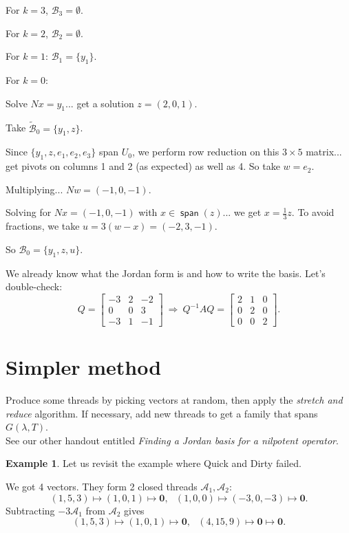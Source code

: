 \documentclass[11pt]{article}
\newcommand{\1}{\mathbf{1}}
\newcommand{\0}{\mathbf{0}}
\newcommand{\A}{\mathcal{A}}
\newcommand{\B}{\mathcal{B}}
\DeclareMathOperator{\myspan}{\mathsf{span}}
\theoremstyle{definition}
\newtheorem{example}{Example}
\begin{document}
For $k=3$, $\B_3 = \emptyset$.

For $k=2$, $\B_2 = \emptyset$.

For $k=1$: $\B_1 = \{y_1\}$.

For $k=0$:

Solve $Nx = y_1$... get a solution $z = (2,0,1)$.

Take $\tilde{\B}_0 = \{y_1,z\}$.

Since $\{y_1,z,e_1,e_2,e_3\}$ span $U_0$, we perform row reduction on this $3 \times 5$ matrix... get pivots on columns 1 and 2 (as expected) as well as 4.
So take $w=e_2$.

Multiplying... $Nw = (-1,0,-1)$.

Solving for $Nx = (-1,0,-1)$ with $x \in \myspan(z)$... we get $x = \frac{1}{3}z$.
To avoid fractions, we take $u = 3 (w-x) = (-2,3,-1)$.

So $\B_0 = \{y_1,z,u\}$.

We already know what the Jordan form is and how to write the basis.
Let's double-check:
\[
Q=
\begin{bmatrix}
-3 & 2 & -2 \\
0 & 0 & 3 \\
-3 & 1 & -1
\end{bmatrix}
\
\Longrightarrow
\
Q^{-1}AQ = 
\left[
\begin{array}{rr|r}
2 & 1 & 0 \\
0 & 2 & 0 \\
\hline
0 & 0 & 2
\end{array}
\right]
.
\]

\clearpage

\section*{Simpler method}

Produce some threads by picking vectors at random, then apply the \emph{stretch and reduce} algorithm.
If necessary, add new threads to get a family that spans $G(\lambda,T)$.
\\

\hfil
See our other handout entitled \emph{Finding a Jordan basis for a nilpotent operator}.
\\

\begin{example}
Let us revisit the example where Quick and Dirty failed.
\end{example}

We got 4 vectors.
They form 2 closed threads $\A_1,\A_2$:
\[
(1,5,3) \mapsto (1,0,1) \mapsto \0
, \ \ \
(1,0,0) \mapsto (-3,0,-3) \mapsto \0
.
\]
Subtracting $-3 \A_1$ from $\A_2$ gives
\[
(1,5,3) \mapsto (1,0,1) \mapsto \0
, \ \ \
(4,15,9) \mapsto \0 \mapsto \0
.
\]
\end{document}
